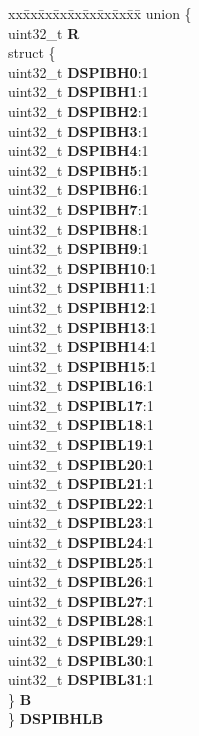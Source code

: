 \begin{DoxyCompactItemize}
\begin{tabbing}
\end{tabbing}\item 
\mbox{\label{structSIU__tag_afc93ef4cc30a0a2a259803ffcd2f941f}} 
\begin{tabbing}
xx\=xx\=xx\=xx\=xx\=xx\=xx\=xx\=xx\=\kill
union \{\\
\>uint32\_t {\bfseries R}\\
\>struct \{\\
\>\>uint32\_t {\bfseries DSPIBH0}:1\\
\>\>uint32\_t {\bfseries DSPIBH1}:1\\
\>\>uint32\_t {\bfseries DSPIBH2}:1\\
\>\>uint32\_t {\bfseries DSPIBH3}:1\\
\>\>uint32\_t {\bfseries DSPIBH4}:1\\
\>\>uint32\_t {\bfseries DSPIBH5}:1\\
\>\>uint32\_t {\bfseries DSPIBH6}:1\\
\>\>uint32\_t {\bfseries DSPIBH7}:1\\
\>\>uint32\_t {\bfseries DSPIBH8}:1\\
\>\>uint32\_t {\bfseries DSPIBH9}:1\\
\>\>uint32\_t {\bfseries DSPIBH10}:1\\
\>\>uint32\_t {\bfseries DSPIBH11}:1\\
\>\>uint32\_t {\bfseries DSPIBH12}:1\\
\>\>uint32\_t {\bfseries DSPIBH13}:1\\
\>\>uint32\_t {\bfseries DSPIBH14}:1\\
\>\>uint32\_t {\bfseries DSPIBH15}:1\\
\>\>uint32\_t {\bfseries DSPIBL16}:1\\
\>\>uint32\_t {\bfseries DSPIBL17}:1\\
\>\>uint32\_t {\bfseries DSPIBL18}:1\\
\>\>uint32\_t {\bfseries DSPIBL19}:1\\
\>\>uint32\_t {\bfseries DSPIBL20}:1\\
\>\>uint32\_t {\bfseries DSPIBL21}:1\\
\>\>uint32\_t {\bfseries DSPIBL22}:1\\
\>\>uint32\_t {\bfseries DSPIBL23}:1\\
\>\>uint32\_t {\bfseries DSPIBL24}:1\\
\>\>uint32\_t {\bfseries DSPIBL25}:1\\
\>\>uint32\_t {\bfseries DSPIBL26}:1\\
\>\>uint32\_t {\bfseries DSPIBL27}:1\\
\>\>uint32\_t {\bfseries DSPIBL28}:1\\
\>\>uint32\_t {\bfseries DSPIBL29}:1\\
\>\>uint32\_t {\bfseries DSPIBL30}:1\\
\>\>uint32\_t {\bfseries DSPIBL31}:1\\
\>\} {\bfseries B}\\
\} {\bfseries DSPIBHLB}\\


\end{tabbing}
\end{DoxyCompactItemize}
